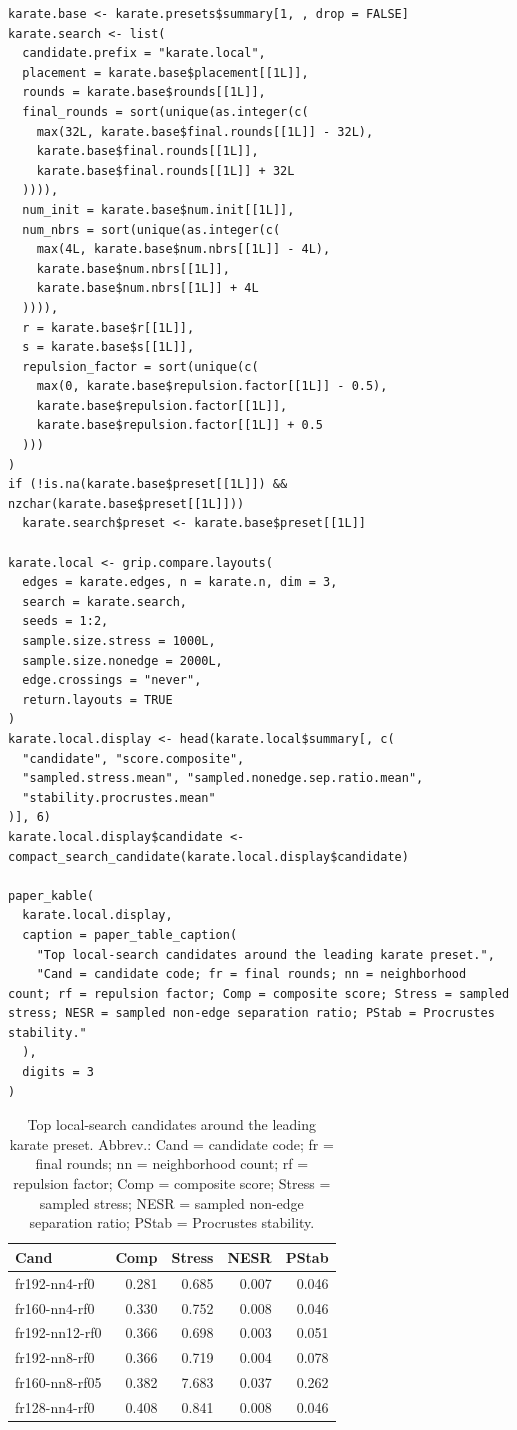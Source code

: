\begin{verbatim}
karate.base <- karate.presets$summary[1, , drop = FALSE]
karate.search <- list(
  candidate.prefix = "karate.local",
  placement = karate.base$placement[[1L]],
  rounds = karate.base$rounds[[1L]],
  final_rounds = sort(unique(as.integer(c(
    max(32L, karate.base$final.rounds[[1L]] - 32L),
    karate.base$final.rounds[[1L]],
    karate.base$final.rounds[[1L]] + 32L
  )))),
  num_init = karate.base$num.init[[1L]],
  num_nbrs = sort(unique(as.integer(c(
    max(4L, karate.base$num.nbrs[[1L]] - 4L),
    karate.base$num.nbrs[[1L]],
    karate.base$num.nbrs[[1L]] + 4L
  )))),
  r = karate.base$r[[1L]],
  s = karate.base$s[[1L]],
  repulsion_factor = sort(unique(c(
    max(0, karate.base$repulsion.factor[[1L]] - 0.5),
    karate.base$repulsion.factor[[1L]],
    karate.base$repulsion.factor[[1L]] + 0.5
  )))
)
if (!is.na(karate.base$preset[[1L]]) && nzchar(karate.base$preset[[1L]]))
  karate.search$preset <- karate.base$preset[[1L]]

karate.local <- grip.compare.layouts(
  edges = karate.edges, n = karate.n, dim = 3,
  search = karate.search,
  seeds = 1:2,
  sample.size.stress = 1000L,
  sample.size.nonedge = 2000L,
  edge.crossings = "never",
  return.layouts = TRUE
)
karate.local.display <- head(karate.local$summary[, c(
  "candidate", "score.composite",
  "sampled.stress.mean", "sampled.nonedge.sep.ratio.mean",
  "stability.procrustes.mean"
)], 6)
karate.local.display$candidate <- compact_search_candidate(karate.local.display$candidate)

paper_kable(
  karate.local.display,
  caption = paper_table_caption(
    "Top local-search candidates around the leading karate preset.",
    "Cand = candidate code; fr = final rounds; nn = neighborhood count; rf = repulsion factor; Comp = composite score; Stress = sampled stress; NESR = sampled non-edge separation ratio; PStab = Procrustes stability."
  ),
  digits = 3
)
\end{verbatim}

\begin{table}

\caption{\label{tab:unnamed-chunk-8}Top local-search candidates around the leading karate preset. Abbrev.: Cand = candidate code; fr = final rounds; nn = neighborhood count; rf = repulsion factor; Comp = composite score; Stress = sampled stress; NESR = sampled non-edge separation ratio; PStab = Procrustes stability.}
\centering
\begin{tabular}[t]{l|r|r|r|r}
\hline
Cand & Comp & Stress & NESR & PStab\\
\hline
fr192-nn4-rf0 & 0.281 & 0.685 & 0.007 & 0.046\\
\hline
fr160-nn4-rf0 & 0.330 & 0.752 & 0.008 & 0.046\\
\hline
fr192-nn12-rf0 & 0.366 & 0.698 & 0.003 & 0.051\\
\hline
fr192-nn8-rf0 & 0.366 & 0.719 & 0.004 & 0.078\\
\hline
fr160-nn8-rf05 & 0.382 & 7.683 & 0.037 & 0.262\\
\hline
fr128-nn4-rf0 & 0.408 & 0.841 & 0.008 & 0.046\\
\hline
\end{tabular}
\end{table}

